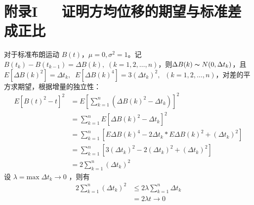 \documentclass{ctexart}
\newcommand{\0}{\boldsymbol{0}}
\begin{document}
\section*{\kaishu\LARGE\bfseries{附录I~~~证明方均位移的期望与标准差成正比}}

    对于标准布朗运动 $B(t)$，$\mu = 0,\sigma^2 = 1$。记$B(t_k)-B(t_{k-1}) = \Delta B(k),\;(k=1,2,\dots,n)$，则$\Delta B(k)\thicksim N(0,\Delta t_k)$，且$E\left[\Delta B(k)^2\right] = \Delta t_k,\;\;E\left[\Delta B(k)^4\right] = 3 (\Delta t_k)^2,\;\;(k=1,2,\dots,n)$，对差的平方求期望，根据增量的独立性：
    \begin{align*}
        E\left[B(t)^2 - t\right]^2 &= E\left[\sum_{k=1}^n (\Delta B(k)^2 -\Delta t_k) \right]^2  \\
        &= \sum_{k=1}^n E\left[\Delta B(k)^2 -\Delta t_k \right]^2     \\
        &= \sum_{k=1}^n \left[E\Delta B(k)^4 -2\Delta t_k * E\Delta B(k)^2 + (\Delta t_k)^2 \right] \\
        &= \sum_{k=1}^n \left[3 (\Delta t_k)^2 -2(\Delta t_k)^2 + (\Delta t_k)^2 \right]\\
        &= 2\sum_{k=1}^n (\Delta t_k)^2
    \end{align*}
    设 $\lambda = \text{max}\;\Delta t_k \rightarrow 0$ ，则有
    \begin{align*}
        2\sum_{k=1}^n (\Delta t_k)^2 &\leq 2 \lambda \sum_{k=1}^n \Delta t_k \\
        &= 2 \lambda t \rightarrow 0
    \end{align*}  

    \pagebreak
\end{document}
